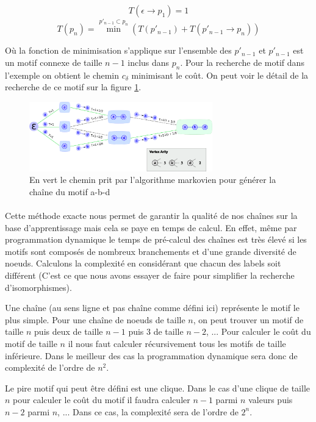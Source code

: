 \documentclass[12pt,french,twoside]{report}
\begin{document}
\begin{equation}
 T(\epsilon \rightarrow p_1) = 1
\end{equation}
\begin{equation}
 T(p_n) = \min^{p'_{n-1} \subset p_n} (T(p'_{n-1}) + T(p'_{n-1} \rightarrow p_n))
\end{equation}

Où la fonction de minimisation s'applique sur l'ensemble des $p'_{n-1}$ et $p'_{n-1}$ est un motif connexe de taille $n-1$ inclus
dans $p_n$. Pour la recherche de motif dans l'exemple on obtient le chemin $c_{\delta}$ minimisant le coût. On peut voir le
détail de la recherche de ce motif sur la figure \ref{markov}.

\begin{figure}
  \includegraphics[width=300px]{Figures/s2m/indexation/markov.png}
  \caption{\label{markov}En vert le chemin prit par l'algorithme markovien pour générer la chaîne du motif a-b-d}
\end{figure}

\paragraph{}Cette méthode exacte nous permet de garantir la qualité de nos chaînes sur la base d'apprentissage mais cela se paye
en temps de calcul. En effet, même par programmation dynamique le temps de pré-calcul des chaînes est très élevé si les motifs sont
composés de nombreux branchements et d'une grande diversité de noeuds. Calculons la complexité en considérant que chacun des
labels soit différent (C'est ce que nous avons essayer de faire pour simplifier la recherche d'isomorphismes).

Une chaîne (au sens ligne et pas chaîne comme défini ici) représente le motif le plus simple. Pour une chaîne de noeuds de taille 
$n$, on peut trouver un motif de taille $n$ puis deux de taille $n-1$ puis 3 de taille $n-2$, ... Pour calculer le coût du motif
de taille $n$ il nous faut calculer récursivement tous les motifs de taille inférieure. Dans le meilleur des cas la programmation
dynamique sera donc de complexité de l'ordre de $n^2$.

Le pire motif qui peut être défini est une clique. Dans le cas d'une clique de taille $n$ pour calculer le coût du motif il faudra
calculer $n-1$ parmi $n$ valeurs puis $n-2$ parmi $n$, ... Dans ce cas, la complexité sera de l'ordre de $2^n$.
\end{document}
